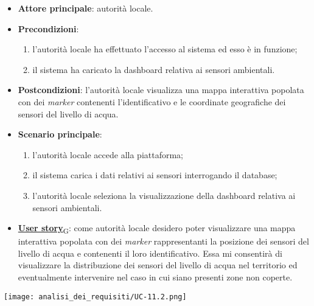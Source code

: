 \begin{itemize}
	\item \textbf{Attore principale}: autorità locale.
	\item \textbf{Precondizioni}:
	      \begin{enumerate}
		      \item l'autorità locale ha effettuato l'accesso al sistema ed esso è in funzione;
		      \item il sistema ha caricato la dashboard relativa ai sensori ambientali.
	      \end{enumerate}
	\item \textbf{Postcondizioni}: l'autorità locale visualizza una mappa interattiva popolata con dei \textit{marker} contenenti l'identificativo e le coordinate geografiche dei sensori del livello di acqua.
	\item \textbf{Scenario principale}:
	      \begin{enumerate}
		      \item l'autorità locale accede alla piattaforma;
		      \item il sistema carica i dati relativi ai sensori interrogando il database;
		      \item l'autorità locale seleziona la visualizzazione della dashboard relativa ai sensori ambientali.
	      \end{enumerate}
	\item \href{https://7last.github.io/docs/pb/documentazione-interna/glossario\#user-story}{\textbf{User story}\textsubscript{G}}:
	      come autorità locale desidero poter visualizzare una mappa interattiva popolata con dei \textit{marker} rappresentanti la posizione dei sensori del livello di acqua
	      e contenenti il loro identificativo. Essa mi consentirà di visualizzare la distribuzione dei sensori del livello di acqua nel territorio ed eventualmente intervenire nel caso in cui siano presenti zone non coperte.
\end{itemize}
\begin{center}
	\texttt{[image: analisi\_dei\_requisiti/UC-11.2.png]}
\end{center}


